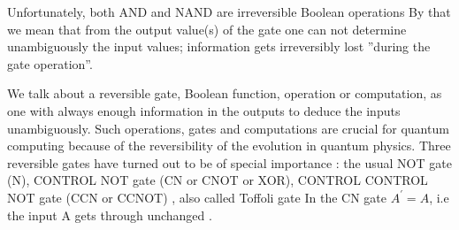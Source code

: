 \documentclass[12pt]{book}
\begin{document}




Unfortunately, both AND and NAND are irreversible Boolean operations By that we
mean that from the output value(s) of the gate one can not determine unambiguously the
input values; information gets irreversibly lost  ''during the gate operation''.

We talk about a reversible gate, Boolean function, operation or computation, as one with always enough information in the outputs to deduce the inputs unambiguously. Such operations, gates and computations are crucial for quantum computing because of the reversibility of the evolution in quantum physics. Three reversible gates have turned out to be of special importance : the usual NOT gate (N), CONTROL NOT gate (CN or CNOT or XOR),  CONTROL CONTROL NOT gate (CCN or CCNOT) , also called Toffoli gate In the CN gate $A^{\prime} = A $, i.e  the input A gets through unchanged .
\end{document}
